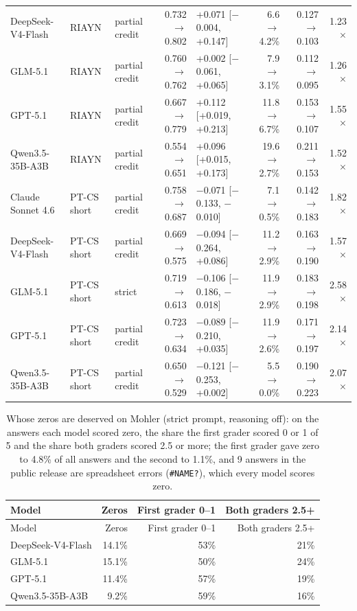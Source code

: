 \documentclass[10pt]{article}
\begin{document}
\begin{longtable}{ll>{\raggedright\arraybackslash}p{1.6cm}r>{\raggedright\arraybackslash}p{2.6cm}rrr}
DeepSeek-V4-Flash & RIAYN & partial credit & 0.732 $\to$ 0.802 & +0.071 [$-$0.004, +0.147] & 6.6 $\to$ 4.2\% & 0.127 $\to$ 0.103 & 1.23$\times$ \\
GLM-5.1 & RIAYN & partial credit & 0.760 $\to$ 0.762 & +0.002 [$-$0.061, +0.065] & 7.9 $\to$ 3.1\% & 0.112 $\to$ 0.095 & 1.26$\times$ \\
GPT-5.1 & RIAYN & partial credit & 0.667 $\to$ 0.779 & +0.112 [+0.019, +0.213] & 11.8 $\to$ 6.7\% & 0.153 $\to$ 0.107 & 1.55$\times$ \\
Qwen3.5-35B-A3B & RIAYN & partial credit & 0.554 $\to$ 0.651 & +0.096 [+0.015, +0.173] & 19.6 $\to$ 2.7\% & 0.211 $\to$ 0.153 & 1.52$\times$ \\
Claude Sonnet 4.6 & PT-CS short & partial credit & 0.758 $\to$ 0.687 & $-$0.071 [$-$0.133, $-$0.010] & 7.1 $\to$ 0.5\% & 0.142 $\to$ 0.183 & 1.82$\times$ \\
DeepSeek-V4-Flash & PT-CS short & partial credit & 0.669 $\to$ 0.575 & $-$0.094 [$-$0.264, +0.086] & 11.2 $\to$ 2.9\% & 0.163 $\to$ 0.190 & 1.57$\times$ \\
GLM-5.1 & PT-CS short & strict & 0.719 $\to$ 0.613 & $-$0.106 [$-$0.186, $-$0.018] & 11.9 $\to$ 2.9\% & 0.183 $\to$ 0.198 & 2.58$\times$ \\
GPT-5.1 & PT-CS short & partial credit & 0.723 $\to$ 0.634 & $-$0.089 [$-$0.210, +0.035] & 11.9 $\to$ 2.6\% & 0.171 $\to$ 0.197 & 2.14$\times$ \\
Qwen3.5-35B-A3B & PT-CS short & partial credit & 0.650 $\to$ 0.529 & $-$0.121 [$-$0.253, +0.002] & 5.5 $\to$ 0.0\% & 0.190 $\to$ 0.223 & 2.07$\times$ \\
\hline
\end{longtable}
\endgroup

\begingroup\footnotesize
\begin{longtable}{lrrr}
\caption{Whose zeros are deserved on Mohler (strict prompt, reasoning off): on the answers each model scored zero, the share the first grader scored 0 or 1 of 5 and the share both graders scored 2.5 or more; the first grader gave zero to 4.8\% of all answers and the second to 1.1\%, and 9 answers in the public release are spreadsheet errors (\texttt{\#NAME?}), which every model scores zero.}\\
\hline
Model & Zeros & First grader 0--1 & Both graders 2.5+ \\ \hline
\endfirsthead
\hline
Model & Zeros & First grader 0--1 & Both graders 2.5+ \\ \hline
\endhead
DeepSeek-V4-Flash & 14.1\% & 53\% & 21\% \\
GLM-5.1 & 15.1\% & 50\% & 24\% \\
GPT-5.1 & 11.4\% & 57\% & 19\% \\
Qwen3.5-35B-A3B & 9.2\% & 59\% & 16\% \\
\hline
\end{longtable}
\endgroup
\end{document}
